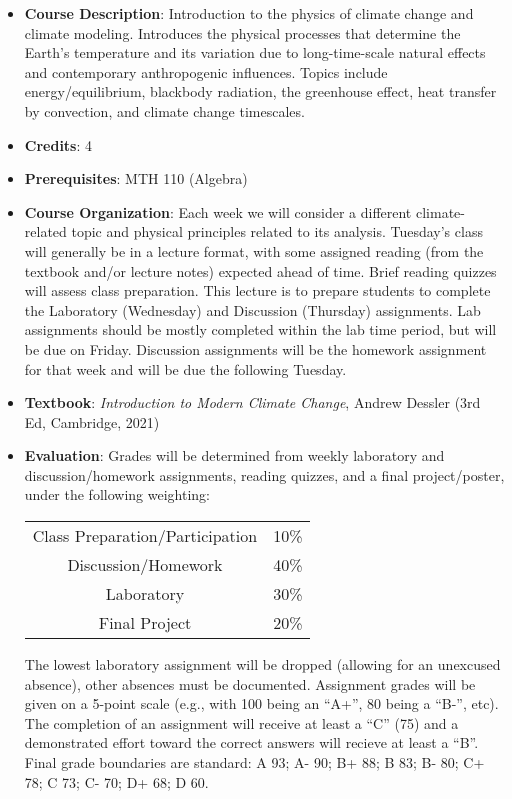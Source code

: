\documentclass{article}
\begin{document}
\vspace{0.5cm}
\begin{itemize}
\item[] {\bf Course Description}: Introduction to the physics of climate change and climate modeling. Introduces the physical processes that determine the Earth's temperature and its variation due to long-time-scale natural effects and contemporary anthropogenic influences. Topics include energy/equilibrium, blackbody radiation, the greenhouse effect, heat transfer by convection, and climate change timescales.

\item[] {\bf Credits}: 4

\item[]{\bf Prerequisites}: MTH 110 (Algebra)

\item[] {\bf Course Organization}: Each week we will consider a different climate-related topic and physical principles related to its analysis. Tuesday's class will generally be in a lecture format, with some assigned reading (from the textbook and/or lecture notes) expected ahead of time. Brief reading quizzes will assess class preparation. This lecture is to prepare students to complete the Laboratory (Wednesday) and Discussion (Thursday) assignments. Lab assignments should be mostly completed within the lab time period, but will be due on Friday.  Discussion assignments will be the homework assignment for that week and will be due the following Tuesday.  %


\item[]{\bf Textbook}: {\em Introduction to Modern Climate Change}, Andrew Dessler (3rd Ed, Cambridge, 2021)

    
\item[] {\bf Evaluation}: Grades will be determined from weekly laboratory and discussion/homework assignments, reading quizzes, and a final project/poster, under the following weighting:
    \begin{center}
    \begin{tabular}{cc}
    Class Preparation/Participation & 10\%\\
    Discussion/Homework & 40\%\\
    Laboratory & 30\% \\
    Final Project & 20\%
    \end{tabular}
    \end{center}
The lowest laboratory assignment will be dropped (allowing for an unexcused absence), other absences must be documented. Assignment grades will be given on a 5-point scale (e.g., with 100 being an ``A+'', 80 being a ``B-'', etc). The completion of an assignment will receive at least a ``C'' (75) and a demonstrated effort toward the correct answers will recieve at least a ``B''. Final grade boundaries are standard: A 93; A-  90; B+ 88; B 83; B- 80; C+ 78; C 73; C- 70; D+ 68; D 60.


\end{itemize}
\end{document}
